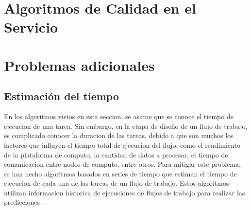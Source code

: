 \section{Algoritmos de Calidad en el Servicio}

\section{Problemas adicionales}

\subsection{Estimación del tiempo}
En los algoritmos vistos en esta seccion, se asume que se conoce el tiempo de ejecucion de una tarea. Sin embargo, en la etapa de diseño de un flujo de trabajo, es complicado conocer la duracion de las tareas, debido a que son muchos los factores que influyen el tiempo total de ejecucion del flujo, como el rendimiento de la plataforma de computo, la cantidad de datos a procesar, el tiempo de comunicacion entre nodos de computo, entre otros. Para mitigar este problema, se han hecho algoritmos basados en series de tiempo que estiman el tiempo de ejecucion de cada una de las tareas de un flujo de trabajo. Estos algoritmos utilizan informacion historica de ejecuciones de flujos de trabajo para realizar las predicciones  \cite{liu2011novel}.